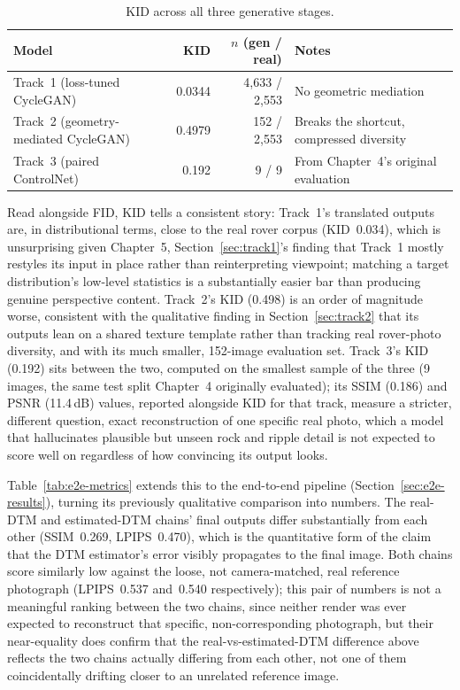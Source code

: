 \begin{table}[H]
  \caption{KID across all three generative stages.}
  \label{tab:common-metrics}
  \centering
  \small
  \begin{tabular}{p{4.6cm}rrp{4.4cm}}
    \toprule
    Model & KID & $n$ (gen / real) & Notes \\
    \midrule
    Track~1 (loss-tuned CycleGAN) & 0.0344 & 4{,}633 / 2{,}553 & No geometric mediation \\
    Track~2 (geometry-mediated CycleGAN) & 0.4979 & 152 / 2{,}553 & Breaks the shortcut, compressed diversity \\
    Track~3 (paired ControlNet) & 0.192 & 9 / 9 & From Chapter~4's original evaluation \\
    \bottomrule
  \end{tabular}
\end{table}

Read alongside FID, KID tells a consistent story: Track~1's translated outputs are, in distributional terms, close to the real rover corpus (KID~0.034), which is unsurprising given Chapter~5, Section~\ref{sec:track1}'s finding that Track~1 mostly restyles its input in place rather than reinterpreting viewpoint; matching a target distribution's low-level statistics is a substantially easier bar than producing genuine perspective content. Track~2's KID (0.498) is an order of magnitude worse, consistent with the qualitative finding in Section~\ref{sec:track2} that its outputs lean on a shared texture template rather than tracking real rover-photo diversity, and with its much smaller, 152-image evaluation set. Track~3's KID (0.192) sits between the two, computed on the smallest sample of the three (9 images, the same test split Chapter~4 originally evaluated); its SSIM (0.186) and PSNR (11.4\,dB) values, reported alongside KID for that track, measure a stricter, different question, exact reconstruction of one specific real photo, which a model that hallucinates plausible but unseen rock and ripple detail is not expected to score well on regardless of how convincing its output looks.

Table~\ref{tab:e2e-metrics} extends this to the end-to-end pipeline (Section~\ref{sec:e2e-results}), turning its previously qualitative comparison into numbers. The real-DTM and estimated-DTM chains' final outputs differ substantially from each other (SSIM~0.269, LPIPS~0.470), which is the quantitative form of the claim that the DTM estimator's error visibly propagates to the final image. Both chains score similarly low against the loose, not camera-matched, real reference photograph (LPIPS~0.537 and~0.540 respectively); this pair of numbers is not a meaningful ranking between the two chains, since neither render was ever expected to reconstruct that specific, non-corresponding photograph, but their near-equality does confirm that the real-vs-estimated-DTM difference above reflects the two chains actually differing from each other, not one of them coincidentally drifting closer to an unrelated reference image.

